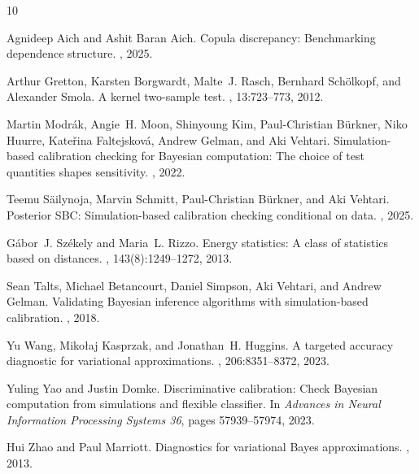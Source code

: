 \documentclass[10pt,twocolumn]{article}
\newcommand{\1}{\mathbf{1}}
\begin{document}
\begin{thebibliography}{10}

Agnideep Aich and Ashit Baran Aich.
\newblock Copula discrepancy: Benchmarking dependence structure.
, 2025.

Arthur Gretton, Karsten Borgwardt, Malte~J. Rasch, Bernhard Sch{\"o}lkopf, and Alexander Smola.
\newblock A kernel two-sample test.
, 13:723--773, 2012.

Martin Modr\'ak, Angie~H. Moon, Shinyoung Kim, Paul-Christian B{\"u}rkner, Niko Huurre, Kate\v{r}ina Faltejskov\'a, Andrew Gelman, and Aki Vehtari.
\newblock Simulation-based calibration checking for Bayesian computation: The choice of test quantities shapes sensitivity.
, 2022.

Teemu S\"ailynoja, Marvin Schmitt, Paul-Christian B{\"u}rkner, and Aki Vehtari.
\newblock Posterior {SBC}: Simulation-based calibration checking conditional on data.
, 2025.

G\'abor~J. Sz\'ekely and Maria~L. Rizzo.
\newblock Energy statistics: A class of statistics based on distances.
, 143(8):1249--1272, 2013.

Sean Talts, Michael Betancourt, Daniel Simpson, Aki Vehtari, and Andrew Gelman.
\newblock Validating Bayesian inference algorithms with simulation-based calibration.
, 2018.

Yu Wang, Miko{\l}aj Kasprzak, and Jonathan~H. Huggins.
\newblock A targeted accuracy diagnostic for variational approximations.
, 206:8351--8372, 2023.

Yuling Yao and Justin Domke.
\newblock Discriminative calibration: Check Bayesian computation from simulations and flexible classifier.
\newblock In {\em Advances in Neural Information Processing Systems 36}, pages 57939--57974, 2023.

Hui Zhao and Paul Marriott.
\newblock Diagnostics for variational Bayes approximations.
, 2013.

\end{thebibliography}
\end{document}
